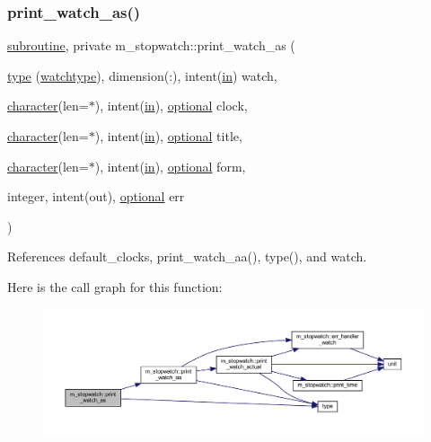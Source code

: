 \subsubsection{\texorpdfstring{print\+\_\+watch\+\_\+as()}{print\_watch\_as()}}
{\footnotesize\ttfamily \hyperlink{M__stopwatch_83_8txt_acfbcff50169d691ff02d4a123ed70482}{subroutine}, private m\+\_\+stopwatch\+::print\+\_\+watch\+\_\+as (\begin{DoxyParamCaption}\item[{\hyperlink{stop__watch_83_8txt_a70f0ead91c32e25323c03265aa302c1c}{type} (\hyperlink{structm__stopwatch_1_1watchtype}{watchtype}), dimension(\+:), intent(\hyperlink{M__journal_83_8txt_afce72651d1eed785a2132bee863b2f38}{in})}]{watch,  }\item[{\hyperlink{option__stopwatch_83_8txt_abd4b21fbbd175834027b5224bfe97e66}{character}(len=$\ast$), intent(\hyperlink{M__journal_83_8txt_afce72651d1eed785a2132bee863b2f38}{in}), \hyperlink{option__stopwatch_83_8txt_aa4ece75e7acf58a4843f70fe18c3ade5}{optional}}]{clock,  }\item[{\hyperlink{option__stopwatch_83_8txt_abd4b21fbbd175834027b5224bfe97e66}{character}(len=$\ast$), intent(\hyperlink{M__journal_83_8txt_afce72651d1eed785a2132bee863b2f38}{in}), \hyperlink{option__stopwatch_83_8txt_aa4ece75e7acf58a4843f70fe18c3ade5}{optional}}]{title,  }\item[{\hyperlink{option__stopwatch_83_8txt_abd4b21fbbd175834027b5224bfe97e66}{character}(len=$\ast$), intent(\hyperlink{M__journal_83_8txt_afce72651d1eed785a2132bee863b2f38}{in}), \hyperlink{option__stopwatch_83_8txt_aa4ece75e7acf58a4843f70fe18c3ade5}{optional}}]{form,  }\item[{integer, intent(out), \hyperlink{option__stopwatch_83_8txt_aa4ece75e7acf58a4843f70fe18c3ade5}{optional}}]{err }\end{DoxyParamCaption})\hspace{0.3cm}{\ttfamily [private]}}



References default\+\_\+clocks, print\+\_\+watch\+\_\+aa(), type(), and watch.

Here is the call graph for this function\+:
\nopagebreak
\begin{figure}[H]
\begin{center}
\leavevmode
\includegraphics[width=350pt]{namespacem__stopwatch_a8c401a6a0108a2cd08e46cc5c9694f81_cgraph}
\end{center}
\end{figure}
\mbox{\label{namespacem__stopwatch_a25075198a53d5b347cd1874e79f38bbb}} 
